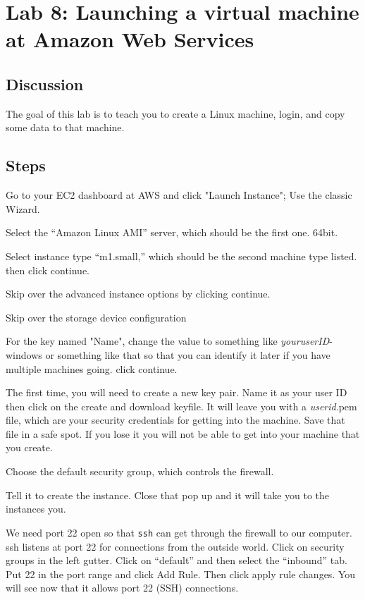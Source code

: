 \chapter[AWS]{Lab 8: Launching a virtual machine at Amazon Web Services}
\label{ch:1}

\setcounter{problem}{1}

\section{Discussion}

\begin{fullwidth}

The goal of this lab is to teach you to create a Linux machine, login, and copy some data to that machine.

\section{Steps}

\step Go to your EC2 dashboard at AWS and click "Launch Instance"; Use the classic Wizard.

\step Select the ``Amazon Linux AMI'' server, which should be the first one. 64bit.

\step Select instance type ``m1.small,'' which should be the second machine type listed. then click continue.

\step Skip over the advanced instance options by clicking continue.

\step Skip over the storage device configuration

\step For the key named "Name", change the value to something like {\em youruserID}-windows or something like that so that you can identify it later if you have multiple machines going. click continue.

\step The first time, you will need to create a new key pair. Name it as your user ID then click on the create and download keyfile. It will leave you with a {\em userid}.pem file, which are your security credentials for getting into the machine. Save that file in a safe spot. If you lose it you will not be able to get into your machine that you create.

\step Choose the default security group, which controls the firewall.

\step Tell it to create the instance. Close that pop up and it will take you to the instances you.

\step We need port 22 open so that {\tt ssh} can get through the firewall to our computer. ssh listens at port 22 for connections from the outside world. Click on security groups in the left gutter. Click on ``default'' and then select the ``inbound'' tab. Put 22 in the port range and click Add Rule. Then click apply rule changes. You will see now that it allows port 22 (SSH) connections.


\end{fullwidth}
